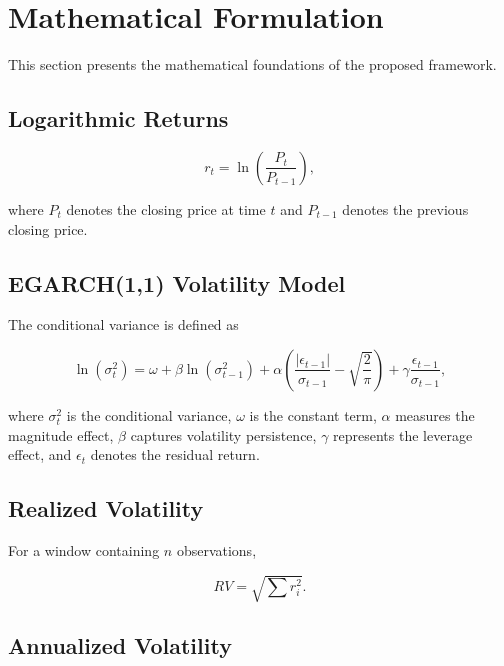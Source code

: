 \documentclass[journal]{IEEEtran}
\begin{document}
\section{Mathematical Formulation}

This section presents the mathematical foundations of the proposed
framework.

\subsection{Logarithmic Returns}

\begin{equation}
r_t=\ln\!\left(\frac{P_t}{P_{t-1}}\right),
\end{equation}

where $P_t$ denotes the closing price at time $t$ and $P_{t-1}$
denotes the previous closing price.

\subsection{EGARCH(1,1) Volatility Model}

The conditional variance is defined as

\begin{equation}
\ln(\sigma_t^2)
= \omega
+ \beta\ln(\sigma_{t-1}^2)
+ \alpha\!\left(\frac{|\epsilon_{t-1}|}{\sigma_{t-1}}
  -\sqrt{\frac{2}{\pi}}\right)
+ \gamma\frac{\epsilon_{t-1}}{\sigma_{t-1}},
\end{equation}

where $\sigma_t^2$ is the conditional variance, $\omega$ is the
constant term, $\alpha$ measures the magnitude effect, $\beta$ captures
volatility persistence, $\gamma$ represents the leverage effect, and
$\epsilon_t$ denotes the residual return.

\subsection{Realized Volatility}

For a window containing $n$ observations,

\begin{equation}
RV = \sqrt{\sum r_i^2}.
\end{equation}

\subsection{Annualized Volatility}
\end{document}
